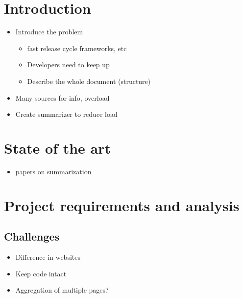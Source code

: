 \documentclass[a4paper]{usiinfbachelorproject}
\author{Your Name}
\title{\projectName}
\subtitle{The (optional) subtitle}
\begin{document}

%
%
%
%
%
%
%
%



\section{Introduction}
\begin{itemize}
\item Introduce the problem
\begin{itemize}
\item fast release cycle frameworks, etc
\item Developers need to keep up
\item Describe the whole document (structure)
\end{itemize}
\item Many sources for info, overload
\item Create summarizer to reduce load
\end{itemize}
\section{State of the art}
\begin{itemize}
\item papers on summarization
\end{itemize}
\section{Project requirements and analysis}
\subsection{Challenges}
\begin{itemize}
	\item Difference in websites
\item Keep code intact
\item Aggregation of multiple pages?
\end{itemize}
\end{document}
